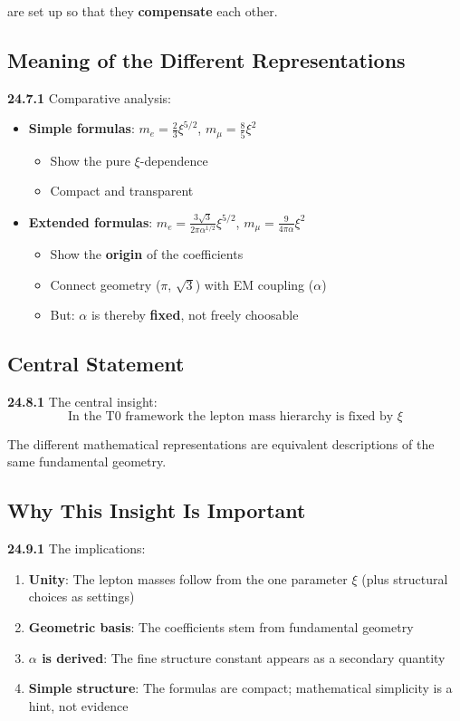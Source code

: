 \noindent are set up so that they \textbf{compensate} each other.

\subsection{Meaning of the Different Representations}

\noindent \textbf{24.7.1} Comparative analysis:
\begin{itemize}
	\item \textbf{Simple formulas}: $m_e = \frac{2}{3}\xi^{5/2}$, $m_\mu = \frac{8}{5}\xi^2$
	\begin{itemize}
		\item Show the pure $\xi$-dependence
		\item Compact and transparent
	\end{itemize}
	
	\item \textbf{Extended formulas}: $m_e = \frac{3\sqrt{3}}{2\pi\alpha^{1/2}}\xi^{5/2}$, $m_\mu = \frac{9}{4\pi\alpha}\xi^2$
	\begin{itemize}
		\item Show the \textbf{origin} of the coefficients
		\item Connect geometry ($\pi$, $\sqrt{3}$) with EM coupling ($\alpha$)
		\item But: $\alpha$ is thereby \textbf{fixed}, not freely choosable
	\end{itemize}
\end{itemize}

\subsection{Central Statement}

\noindent \textbf{24.8.1} The central insight:
\[
\boxed{
	\text{In the T0 framework the lepton mass hierarchy is fixed by } \xi
}
\]

The different mathematical representations are equivalent descriptions of the same fundamental geometry.

\subsection{Why This Insight Is Important}

\noindent \textbf{24.9.1} The implications:
\begin{enumerate}
	\item \textbf{Unity}: The lepton masses follow from the one parameter $\xi$ (plus structural choices as settings)
	\item \textbf{Geometric basis}: The coefficients stem from fundamental geometry
	\item \textbf{$\alpha$ is derived}: The fine structure constant appears as a secondary quantity
	\item \textbf{Simple structure}: The formulas are compact; mathematical simplicity is a hint, not evidence
\end{enumerate}

